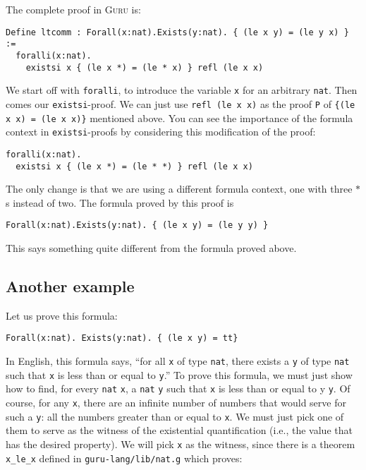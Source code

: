 \documentclass{book}[12pt]
\newcommand{\guru}[0]{\textsc{Guru}\xspace}
\begin{document}
\noindent The complete proof in \guru is:

\begin{verbatim}
Define ltcomm : Forall(x:nat).Exists(y:nat). { (le x y) = (le y x) } :=
  foralli(x:nat).
    existsi x { (le x *) = (le * x) } refl (le x x)
\end{verbatim}

\noindent We start off with \texttt{foralli}, to introduce the
variable \texttt{x} for an arbitrary \texttt{nat}.  Then comes our
\texttt{existsi}-proof.  We can just use \texttt{refl (le x x)} as the
proof \texttt{P} of \texttt{\{(le x x) = (le x x)\}} mentioned above.
You can see the importance of the formula context in
\texttt{existsi}-proofs by considering this modification of the proof:

\begin{verbatim}
foralli(x:nat).
  existsi x { (le x *) = (le * *) } refl (le x x)
\end{verbatim}

\noindent The only change is that we are using a different formula
context, one with three $*$s instead of two.  The formula proved by
this proof is

\begin{verbatim}
Forall(x:nat).Exists(y:nat). { (le x y) = (le y y) }
\end{verbatim}

\noindent This says something quite different from the formula proved
above.

\subsection{Another example}
\label{ch5:existsi2}

Let us prove this formula:

\begin{verbatim}
Forall(x:nat). Exists(y:nat). { (le x y) = tt}
\end{verbatim}

\noindent In English, this formula says, ``for all \texttt{x} of type
\texttt{nat}, there exists a \texttt{y} of type \texttt{nat} such that
\texttt{x} is less than or equal to \texttt{y}.''  To prove this
formula, we must just show how to find, for every \texttt{nat}
\texttt{x}, a \texttt{nat} \texttt{y} such that \texttt{x} is less
than or equal to y \texttt{y}.  Of course, for any \texttt{x}, there
are an infinite number of numbers that would serve for such a
\texttt{y}: all the numbers greater than or equal to \texttt{x}.  We
must just pick one of them to serve as the witness of the existential
quantification (i.e., the value that has the desired property).  We
will pick \texttt{x} as the witness, since there is a theorem
\texttt{x\_le\_x} defined in \texttt{guru-lang/lib/nat.g} which
proves:
\end{document}

